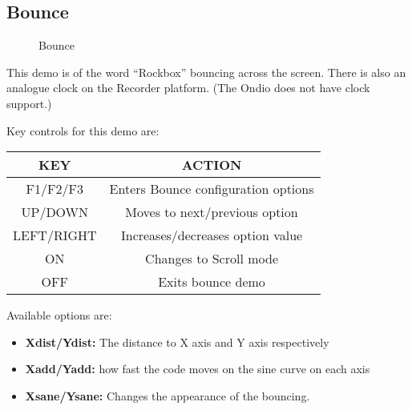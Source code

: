 \subsection{Bounce}
\begin{figure}[h]
\begin{center}
\end{center}
\caption{Bounce}
\end{figure}

This demo is of the word ``Rockbox'' bouncing across the screen.  There
is also an analogue clock on the Recorder platform.  (The Ondio does
not have clock support.)

Key controls for this demo are:

\begin{table}[h!]
\begin{center}
\begin{tabular}{|c|c|}
\hline
KEY & ACTION \\\hline
F1/F2/F3 & Enters Bounce configuration options \\\hline
UP/DOWN & Moves to next/previous option \\\hline
LEFT/RIGHT & Increases/decreases option value \\\hline
ON & Changes to Scroll mode \\\hline
OFF & Exits bounce demo\\\hline
\end{tabular}
\end{center}
\end{table}
Available options are:

\begin{itemize}
\item \textbf{Xdist/Ydist:} The distance to X axis and Y axis
respectively
\item \textbf{Xadd/Yadd:} how fast the code moves on the sine curve on
each axis
\item \textbf{Xsane/Ysane:} Changes the appearance of the bouncing.
\end{itemize}
